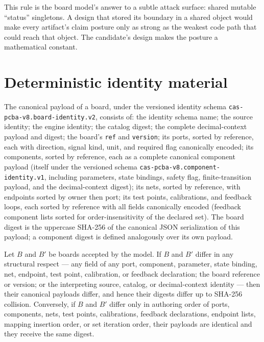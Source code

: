 This rule is the board model's answer to a subtle attack surface: shared
mutable ``status'' singletons. A design that stored its boundary in a
shared object would make every artifact's claim posture only as strong as
the weakest code path that could reach that object. The candidate's
design makes the posture a mathematical constant.

\section{Deterministic identity material}\label{ch05:sec:identity}

\begin{construction}\label{ch05:con:payload}
The canonical payload of a board, under the versioned identity schema
\texttt{cas-pcba-v8.board-identity.v2}, consists of: the identity schema
name; the source identity; the engine identity; the catalog digest; the
complete decimal-context payload and digest; the board's \texttt{ref} and
\texttt{version}; its ports, sorted by reference, each with direction,
signal kind, unit, and required flag canonically encoded; its components,
sorted by reference, each as a complete canonical component payload
(itself under the versioned schema
\texttt{cas-pcba-v8.component-identity.v1}, including parameters, state
bindings, safety flag, finite-transition payload, and the decimal-context
digest); its nets, sorted by reference, with endpoints sorted by owner
then port; its test points, calibrations, and feedback loops, each sorted
by reference with all fields canonically encoded (feedback component
lists sorted for order-insensitivity of the declared set). The board
digest is the uppercase SHA-256 of the canonical JSON serialization of
this payload; a component digest is defined analogously over its own
payload.
\end{construction}

\begin{proposition}
\label{ch05:prop:digest}
Let $B$ and $B'$ be boards accepted by the model. If $B$ and $B'$ differ
in any structural respect --- any field of any port, component,
parameter, state binding, net, endpoint, test point, calibration, or
feedback declaration; the board reference or version; or the interpreting
source, catalog, or decimal-context identity --- then their canonical
payloads differ, and hence their digests differ up to SHA-256 collision.
Conversely, if $B$ and $B'$ differ only in authoring order of ports,
components, nets, test points, calibrations, feedback declarations,
endpoint lists, mapping insertion order, or set iteration order, their
payloads are identical and they receive the same digest.
\end{proposition}

